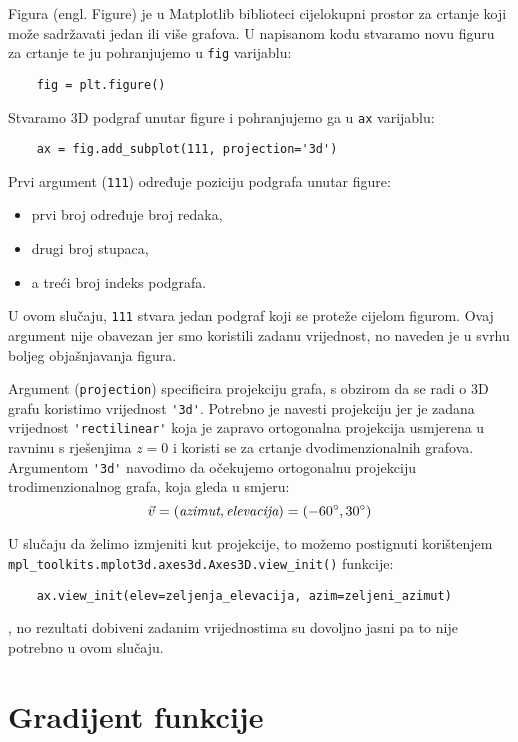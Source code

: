 Figura (engl. Figure) je u Matplotlib biblioteci cijelokupni prostor za crtanje koji može sadržavati jedan ili više grafova.
U napisanom kodu stvaramo novu figuru za crtanje te ju pohranjujemo u \verb|fig| varijablu:
\begin{verbatim}
    fig = plt.figure()
\end{verbatim}

Stvaramo 3D podgraf unutar figure i pohranjujemo ga u \verb|ax| varijablu:

\begin{verbatim}
    ax = fig.add_subplot(111, projection='3d')
\end{verbatim} 

Prvi argument (\verb|111|) određuje poziciju podgrafa unutar figure:
\begin{itemize}
    \item prvi broj određuje broj redaka,
    \item drugi broj stupaca,
    \item a treći broj indeks podgrafa.
\end{itemize}
U ovom slučaju, \verb|111| stvara jedan podgraf koji se proteže cijelom figurom. Ovaj argument nije obavezan jer smo koristili zadanu vrijednost, no naveden je u svrhu boljeg objašnjavanja figura.

Argument (\verb|projection|) specificira projekciju grafa, s obzirom da se radi o 3D grafu koristimo vrijednost \verb|'3d'|.
Potrebno je navesti projekciju jer je zadana vrijednost \verb|'rectilinear'| koja je zapravo ortogonalna projekcija usmjerena u ravninu s rješenjima $z = 0$ i koristi se za crtanje dvodimenzionalnih grafova.
Argumentom \verb|'3d'| navodimo da očekujemo ortogonalnu projekciju trodimenzionalnog grafa, koja gleda u smjeru:
$$
    \vec{v} = (\text{\it azimut}, \text{\it elevacija}) = (-60^{\circ}, 30^{\circ})
$$

U slučaju da želimo izmjeniti kut projekcije, to možemo postignuti korištenjem \verb|mpl_toolkits.mplot3d.axes3d.Axes3D.view_init()| funkcije:
\begin{verbatim}
    ax.view_init(elev=zeljenja_elevacija, azim=zeljeni_azimut)
\end{verbatim}
, no rezultati dobiveni zadanim vrijednostima su dovoljno jasni pa to nije potrebno u ovom slučaju.

\section{Gradijent funkcije}

